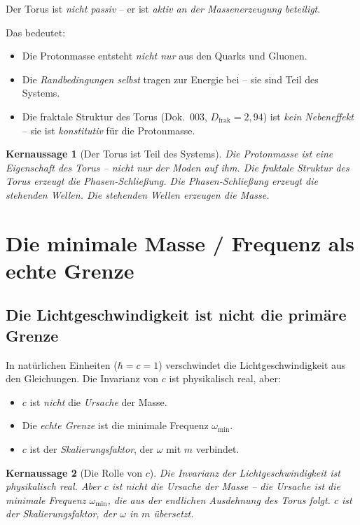 \documentclass[11pt,a4paper]{article}
\newtheorem{keyresult}{Kernaussage}
\begin{document}
	Der Torus ist \emph{nicht passiv} -- er ist \emph{aktiv an der Massenerzeugung beteiligt}.
	
	Das bedeutet:
	\begin{itemize}
		\item Die Protonmasse entsteht \emph{nicht nur} aus den Quarks und Gluonen.
		\item Die \emph{Randbedingungen selbst} tragen zur Energie bei -- sie sind Teil des Systems.
		\item Die fraktale Struktur des Torus (Dok.~003, \(D_{\text{frak}} = 2{,}94\)) ist \emph{kein Nebeneffekt} -- sie ist \emph{konstitutiv} für die Protonmasse.
	\end{itemize}
	
	\begin{keyresult}[Der Torus ist Teil des Systems]
		Die Protonmasse ist eine Eigenschaft des Torus -- nicht nur der Moden auf ihm. 
		Die fraktale Struktur des Torus erzeugt die Phasen-Schließung. 
		Die Phasen-Schließung erzeugt die stehenden Wellen. 
		Die stehenden Wellen erzeugen die Masse.
	\end{keyresult}
	
	\section{Die minimale Masse / Frequenz als echte Grenze}
	
	\subsection{Die Lichtgeschwindigkeit ist nicht die primäre Grenze}
	
	In natürlichen Einheiten (\(\hbar = c = 1\)) verschwindet die Lichtgeschwindigkeit aus den Gleichungen. 
	Die Invarianz von \(c\) ist physikalisch real, aber:
	\begin{itemize}
		\item \(c\) ist \emph{nicht} die \emph{Ursache} der Masse.
		\item Die \emph{echte Grenze} ist die minimale Frequenz \(\omega_{\min}\).
		\item \(c\) ist der \emph{Skalierungsfaktor}, der \(\omega\) mit \(m\) verbindet.
	\end{itemize}
	
	\begin{keyresult}[Die Rolle von \(c\)]
		Die Invarianz der Lichtgeschwindigkeit ist physikalisch real. 
		Aber \(c\) ist nicht die Ursache der Masse -- die Ursache ist die minimale Frequenz \(\omega_{\min}\), 
		die aus der endlichen Ausdehnung des Torus folgt. 
		\(c\) ist der Skalierungsfaktor, der \(\omega\) in \(m\) übersetzt.
	\end{keyresult}
	
\end{document}
